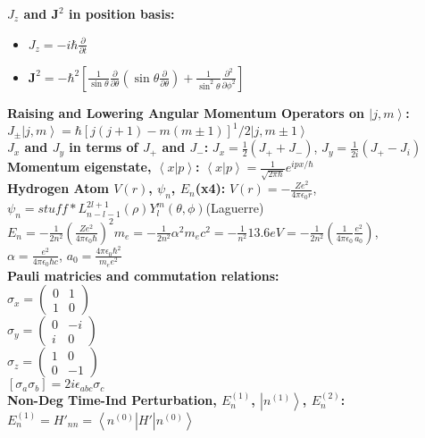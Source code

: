 \documentclass[12pt]{extarticle}
\newcommand{\ket}[1]{\left| #1 \right>}
\newcommand{\bra}[1]{\left< #1 \right|}
\newcommand{\braket}[2]{\left< #1 | #2 \right>}
\begin{document}
\textbf{$J_z$ and $\mathbf{J}^2$ in position basis:}
\begin{itemize}
  \item $J_z = -i\hbar \frac{\partial}{\partial t}$
  \item $\mathbf{J}^2 = -\hbar^2\left[ \frac{1}{\sin\theta}\frac{\partial}{\partial\theta}\left(\sin\theta\frac{\partial}{\partial\theta}\right) + \frac{1}{\sin^2\theta}\frac{\partial^2}{\partial\phi^2} \right]$
\end{itemize}
\textbf{Raising and Lowering Angular Momentum Operators on $\ket{j,m}$:} \\
$J_{\pm}\ket{j,m} = \hbar[j(j+1)-m(m\pm1)]^1/2\ket{j,m\pm1}$ \\
\textbf{$J_x$ and $J_y$ in terms of $J_+$ and $J_-$:} $J_x = \frac{1}{2}(J_++J_-)$, $J_y = \frac{1}{2i}(J_+-J_i)$\\
\textbf{Momentum eigenstate, $\braket{x}{p}$:} $\braket{x}{p} = \frac{1}{\sqrt{2\pi\hbar}}e^{ipx/\hbar}$ \\
\textbf{Hydrogen Atom $V(r)$, $\psi_n$, $E_n$(x4):} $V(r) = -\frac{Ze^2}{4\pi\epsilon_0r}$, $\psi_n = stuff*L^{2l+1}_{n-l-1}(\rho)Y_l^m(\theta,\phi)$(Laguerre) \\
$E_n = -\frac{1}{2n^2}\left(\frac{Ze^2}{4\pi\epsilon_0\hbar}\right)^2m_e = -\frac{1}{2n^2}\alpha^2m_e c^2 = -\frac{1}{n^2}13.6eV = -\frac{1}{2n^2}\left(\frac{1}{4\pi\epsilon_0}\frac{e^2}{a_0}\right)$, \\
$\alpha = \frac{e^2}{4\pi\epsilon_0\hbar c}$, $a_0 = \frac{4\pi\epsilon_0\hbar^2}{m_ee^2}$ \\
\textbf{Pauli matricies and commutation relations:} \\
$\sigma_x = \begin{pmatrix} 0&1 \\ 1&0 \end{pmatrix}$ \\
$\sigma_y = \begin{pmatrix} 0&-i \\ i&0 \end{pmatrix}$ \\
$\sigma_z = \begin{pmatrix} 1&0 \\ 0&-1 \end{pmatrix}$ \\
$\left[\sigma_a\sigma_b\right] = 2i\epsilon_{abc}\sigma_c$ \\
\textbf{Non-Deg Time-Ind Perturbation, $E_n^{(1)}$, $\ket{n^{(1)}}$, $E_n^{(2)}$:} \\
$E_n^{(1)} = H'_{nn} = \bra{n^{(0)}}H'\ket{n^{(0)}}$ \\
\end{document}
